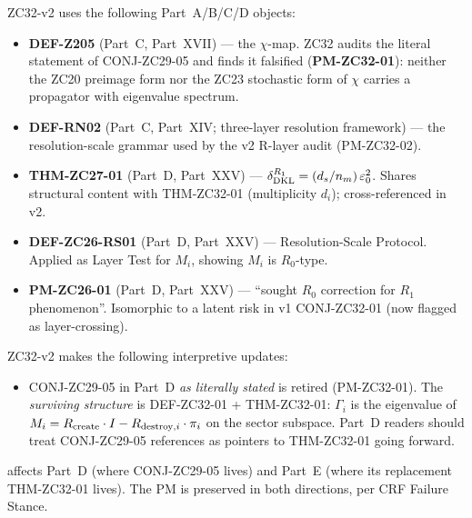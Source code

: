 \documentclass[12pt, a4paper]{article}
\begin{document}
\begin{inheritbox}
ZC32-v2 uses the following Part~A/B/C/D objects:
\begin{itemize}[noitemsep,leftmargin=1.5em]
  \item \textbf{DEF-Z205} (Part~C, Part~XVII) --- the $\chi$-map.
    ZC32 audits the literal statement of CONJ-ZC29-05 and finds it
    falsified (\textbf{PM-ZC32-01}): neither the ZC20 preimage form
    nor the ZC23 stochastic form of $\chi$ carries a propagator with
    eigenvalue spectrum.
  \item \textbf{DEF-RN02} (Part~C, Part~XIV; three-layer resolution
    framework) --- the resolution-scale grammar used by the
    v2 R-layer audit (PM-ZC32-02).
  \item \textbf{THM-ZC27-01} (Part~D, Part~XXV) ---
    $\delta_{\rm DKL}^{R_1} = (d_s/n_m)\,\varepsilon_0^2$.
    Shares structural content with THM-ZC32-01 (multiplicity $d_i$);
    cross-referenced in v2.
  \item \textbf{DEF-ZC26-RS01} (Part~D, Part~XXV) ---
    Resolution-Scale Protocol. Applied as Layer Test for $M_i$,
    showing $M_i$ is $R_0$-type.
  \item \textbf{PM-ZC26-01} (Part~D, Part~XXV) ---
    ``sought $R_0$ correction for $R_1$ phenomenon''.
    Isomorphic to a latent risk in v1 CONJ-ZC32-01 (now flagged
    as layer-crossing).
\end{itemize}
\end{inheritbox}

\begin{correctionbox}
ZC32-v2 makes the following interpretive updates:
\begin{itemize}[noitemsep,leftmargin=1.5em]
  \item CONJ-ZC29-05 in Part~D \emph{as literally stated} is
    retired (PM-ZC32-01). The \emph{surviving structure} is
    DEF-ZC32-01 + THM-ZC32-01: $\Gamma_i$ is the eigenvalue of
    $M_i = R_{\rm create}\cdot I - R_{{\rm destroy},i}\cdot\pi_i$
    on the sector subspace. Part~D readers should treat
    CONJ-ZC29-05 references as pointers to THM-ZC32-01 going forward.
\end{itemize}
\end{correctionbox}

\noindent {} affects Part~D (where CONJ-ZC29-05 lives)
and Part~E (where its replacement THM-ZC32-01 lives). The PM is
preserved in both directions, per CRF Failure Stance.

\bigskip
\end{document}
